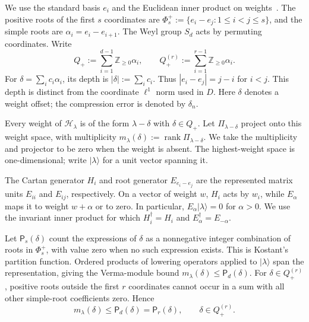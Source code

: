 \documentclass[a4paper,onecolumn,11pt]{quantumarticle}
\newcommand{\ket}[1]{| #1 \rangle}
\begin{document}
We use the standard basis $e_i$ and the Euclidean
inner product on weights~\cite{fulton1991representation}.
The positive roots of the first $s$ coordinates are
$\Phi_s^+:=\{e_i-e_j:1\le i<j\le s\}$, and the simple roots are
$\alpha_i=e_i-e_{i+1}$. The Weyl group $S_d$ acts by permuting
coordinates. Write
\[
Q_+:=\sum_{i=1}^{d-1}\mathbb Z_{\ge0}\alpha_i,\qquad
Q_+^{(r)}:=\sum_{i=1}^{r-1}\mathbb Z_{\ge0}\alpha_i.
\]
For $\delta=\sum_i c_i\alpha_i$, its depth is $|\delta|:=\sum_i c_i$.
Thus $|e_i-e_j|=j-i$ for $i<j$. This depth is distinct from the
coordinate $\ell^1$ norm used in $D$. Here $\delta$ denotes a weight
offset; the compression error is denoted by $\delta_n$.

Every weight of $\mathcal H_\lambda$ is of the form
$\lambda-\delta$ with $\delta\in Q_+$. Let $\Pi_{\lambda-\delta}$
project onto this weight space, with multiplicity
$m_\lambda(\delta):=\operatorname{rank}\Pi_{\lambda-\delta}$.
We take the multiplicity and projector to be zero when the weight
is absent. The highest-weight space is one-dimensional; write
$\ket{\lambda}$ for a unit vector spanning it.

The Cartan generator $H_i$ and root generator $E_{e_i-e_j}$ are the
represented matrix units $E_{ii}$ and $E_{ij}$, respectively.
On a vector of weight $w$, $H_i$ acts by $w_i$, while $E_\alpha$
maps it to weight $w+\alpha$ or to zero. In particular,
$E_\alpha\ket{\lambda}=0$ for $\alpha>0$.
We use the invariant inner product for which $H_i^\dagger=H_i$
and $E_\alpha^\dagger=E_{-\alpha}$.

Let $\mathsf P_s(\delta)$ count the expressions of $\delta$ as a
nonnegative integer combination of roots in $\Phi_s^+$, with value
zero when no such expression exists. This is Kostant's partition
function. Ordered products of lowering operators applied to
$\ket{\lambda}$ span the representation, giving the Verma-module bound
$m_\lambda(\delta)\le\mathsf P_d(\delta)$.
For $\delta\in Q_+^{(r)}$, positive roots outside the
first $r$ coordinates cannot occur in a sum with all other
simple-root coefficients zero. Hence
\begin{equation}\label{eq:verma_multiplicity_bound}
m_\lambda(\delta)\le\mathsf P_d(\delta)=\mathsf P_r(\delta),
\qquad \delta\in Q_+^{(r)}.
\end{equation}
\end{document}
